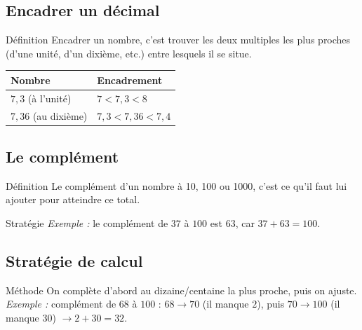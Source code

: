 \subsection{Encadrer un décimal}

\begin{regle}{Définition}
Encadrer un nombre, c'est trouver les deux multiples les plus proches (d'une unité, d'un dixième, etc.) entre lesquels il se situe.
\end{regle}

\vspace{6pt}
\def\arraystretch{1.2}
\begin{tabularx}{\linewidth}{|X|X|}
\hline
\cellcolor{themeNO!30}\textbf{Nombre} & \cellcolor{themeNO!30}\textbf{Encadrement} \\\hline
$7,3$ (à l'unité) & $7 < 7,3 < 8$ \\\hline
$7,36$ (au dixième) & $7,3 < 7,36 < 7,4$ \\\hline
\end{tabularx}
\def\arraystretch{1}


\newpage
\semaineinvisible
{} 

\vfill
\subsection{Le complément}

\begin{regle}{Définition}
Le complément d'un nombre à 10, 100 ou 1000, c'est ce qu'il faut lui ajouter pour atteindre ce total.
\end{regle}

\vspace{6pt}
\begin{astuce}{Stratégie}
\textit{Exemple :} le complément de $37$ à $100$ est $63$, car $37 + 63 = 100$.
\end{astuce}

\vspace{10pt}
\subsection{Stratégie de calcul}

\begin{astuce}{Méthode}
On complète d'abord au dizaine/centaine la plus proche, puis on ajuste.\\
\textit{Exemple :} complément de $68$ à $100$ : $68 \to 70$ (il manque $2$), puis $70 \to 100$ (il manque $30$) $\to 2 + 30 = 32$.
\end{astuce}

